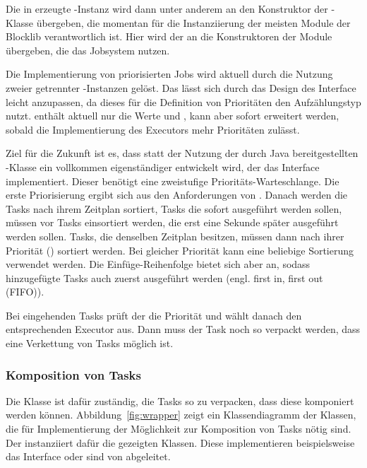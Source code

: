 Die in  erzeugte -Instanz wird dann unter anderem an den Konstruktor der -Klasse übergeben, die momentan für die Instanziierung der meisten Module der Blocklib verantwortlich ist. Hier wird der  an die Konstruktoren der Module übergeben, die das Jobsystem nutzen.

Die Implementierung von priorisierten Jobs wird aktuell durch die Nutzung zweier getrennter -Instanzen gelöst. Das lässt sich durch das Design des Interface  leicht anzupassen, da dieses für die Definition von Prioritäten den Aufzählungstyp  nutzt.  enthält aktuell nur die Werte  und , kann aber sofort erweitert werden, sobald die Implementierung des Executors mehr Prioritäten zulässt. 

Ziel für die Zukunft ist es, dass statt der Nutzung der durch Java bereitgestellten -Klasse ein vollkommen eigenständiger  entwickelt wird, der das Interface  implementiert. Dieser benötigt eine zweistufige Prioritäts-Warteschlange. Die erste Priorisierung ergibt sich aus den Anforderungen von . Danach werden die Tasks nach ihrem Zeitplan sortiert, Tasks die sofort ausgeführt werden sollen, müssen vor Tasks einsortiert werden, die erst eine Sekunde später ausgeführt werden sollen. Tasks, die denselben Zeitplan besitzen, müssen dann nach ihrer Priorität () sortiert werden. Bei gleicher Priorität kann eine beliebige Sortierung verwendet werden. Die Einfüge-Reihenfolge bietet sich aber an, sodass hinzugefügte Tasks auch zuerst ausgeführt werden (engl. first in, first out (FIFO)).

Bei eingehenden Tasks prüft der  die Priorität und wählt danach den entsprechenden Executor aus. Dann muss der Task noch so verpackt werden, dass eine Verkettung von Tasks möglich ist.

\subsubsection{Komposition von Tasks}\label{sec:Verkettung}
Die Klasse  ist dafür zuständig, die Tasks so zu verpacken, dass diese komponiert werden können. Abbildung~\ref{fig:wrapper} zeigt ein Klassendiagramm der Klassen, die für Implementierung der Möglichkeit zur Komposition von Tasks nötig sind. Der  instanziiert dafür die gezeigten Klassen. Diese implementieren beispielsweise das Interface  oder sind von  abgeleitet.

